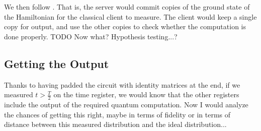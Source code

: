 We then follow \cite{mahadev_delegation}. That is, the server would commit copies of the ground state of the Hamiltonian for the classical client to measure.
The client would keep a single copy for output, and use the other copies to check whether the computation is done properly.
TODO Now what? Hypothesis testing...?

\subsection{Getting the Output}

Thanks to having padded the circuit with identity matrices at the end, if we measured $t>\frac{T}{2}$ on the time register, we would know that the other registers include the output of the required quantum computation. Now I would analyze the chances of getting this right, maybe in terms of fidelity or in terms of distance between this measured distribution and the ideal distribution...
